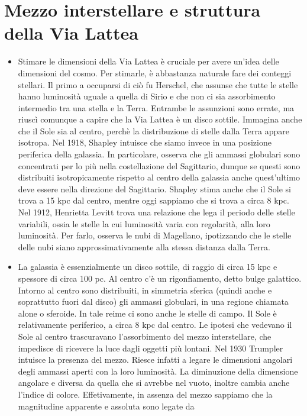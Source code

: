 \documentclass[a4paper,11pt]{article}
\theoremstyle{theorem}
\theoremstyle{definition}
\begin{document}
	\section{Mezzo interstellare e struttura della Via Lattea}
	\begin{itemize}
		\item Stimare le dimensioni della Via Lattea è cruciale per avere un'idea delle dimensioni del cosmo. Per stimarle, è abbastanza naturale fare dei conteggi stellari. Il primo a occuparsi di ciò fu Herschel, che assunse che tutte le stelle hanno luminosità uguale a quella di Sirio e che non ci sia assorbimento intermedio tra una stella e la Terra. Entrambe le assunzioni sono errate, ma riuscì comunque a capire che la Via Lattea è un disco sottile. Immagina anche che il Sole sia al centro, perchè la distribuzione di stelle dalla Terra appare isotropa. Nel 1918, Shapley intuisce che siamo invece in una posizione periferica della galassia. In particolare, osserva che gli ammassi globulari sono concentrati per lo più nella costellazione del Sagittario, dunque se questi sono distribuiti isotropicamente rispetto al centro della galassia anche quest'ultimo deve essere nella direzione del Sagittario. Shapley stima anche che il Sole si trova a 15 kpc dal centro, mentre oggi sappiamo che si trova a circa 8 kpc. Nel 1912, Henrietta Levitt trova una relazione che lega il periodo delle stelle variabili, ossia le stelle la cui luminosità varia con regolarità, alla loro luminosità. Per farlo, osserva le nubi di Magellano, ipotizzando che le stelle delle nubi siano approssimativamente alla stessa distanza dalla Terra.
		\item La galassia è essenzialmente un disco sottile, di raggio di circa 15 kpc e spessore di circa 100 pc. Al centro c'è un rigonfiamento, detto bulge galattico. Intorno al centro sono distribuiti, in simmetria sferica (quindi anche e soprattutto fuori dal disco) gli ammassi globulari, in una regione chiamata alone o sferoide. In tale reime ci sono anche le stelle di campo. Il Sole è relativamente periferico, a circa 8 kpc dal centro. Le ipotesi che vedevano il Sole al centro trascuravano l'assorbimento del mezzo interstellare, che impedisce di ricevere la luce dagli oggetti più lontani. Nel 1930 Trumpler intuisce la presenza del mezzo. Riesce infatti a legare le dimensioni angolari degli ammassi aperti con la loro luminosità. La diminuzione della dimensione angolare e diversa da quella che si avrebbe nel vuoto, inoltre cambia anche l'indice di colore. Effetivamente, in assenza del mezzo sappiamo che la magnitudine apparente e assoluta sono legate da

\end{itemize}
\end{document}
